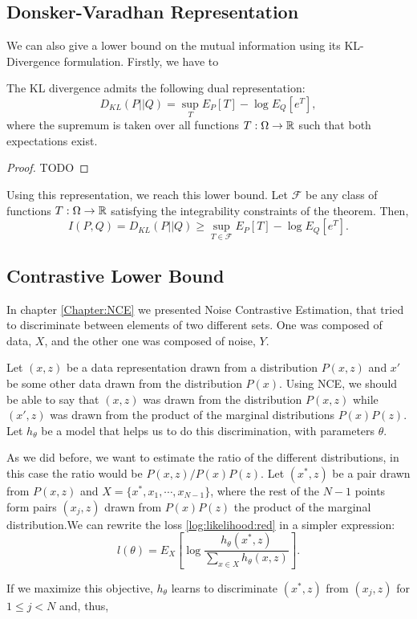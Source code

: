 \subsection*{Donsker-Varadhan Representation}

We can also give a lower bound on the mutual information using its KL-Divergence formulation. Firstly, we have to 

\begin{nth}
The KL divergence admits the following dual representation:
\[
D_{KL}(P || Q) = \sup_{T} E_P[T] - \log E_Q[e^T],
\]
where the supremum is taken over all functions $T:\Omega \to \mathbb{R}$ such that both expectations exist.
\end{nth}
\begin{proof}
    TODO
\end{proof}

Using this representation, we reach this lower bound. Let $\mathcal F$ be any class of functions $T: \Omega \to \mathbb{R}$ satisfying the integrability constraints of the theorem. Then, 
$$
I(P,Q) = D_{KL}(P||Q) \geq \sup_{T \in \mathcal F} E_P[T] - \log E_Q[e^T].
$$

\subsection*{Contrastive Lower Bound}

In chapter \ref{Chapter:NCE} we presented Noise Contrastive Estimation, that tried to discriminate between elements of two different sets. One was composed of data, $X$, and the other one was composed of noise, $Y$.

Let $(x,z)$ be a data representation drawn from a distribution $P(x,z)$ and $x'$ be some other data drawn from the distribution $P(x)$. Using NCE, we should be able to say that $(x,z)$ was drawn from the distribution $P(x,z)$ while $(x',z)$ was drawn from the product of the marginal distributions $P(x)P(z)$. Let $h_\theta$ be a model that helps us to do this discrimination, with parameters $\theta$. 

As we did before, we want to estimate the ratio of the different distributions, in this case the ratio would be $P(x,z)/P(x)P(z)$. Let $(x^*,z)$ be a pair drawn from $P(x,z)$ and $X = \{x^*, x_1,\cdots,x_{N-1} \}$, where the rest of the $N-1$ points form pairs $(x_j,z)$ drawn from $P(x)P(z)$ the product of the marginal distribution.We can rewrite the loss \ref{log:likelihood:red} in a simpler expression:
\[
l(\theta) = E_X \left[ \log \frac{h_\theta(x^*,z)}{\sum_{x \in X}h_\theta(x,z)}\right]  .
\]

If we maximize this objective, $h_\theta$ learns to discriminate $(x^*,z)$ from $(x_j,z)$ for $ 1 \leq j < N$ and, thus, 